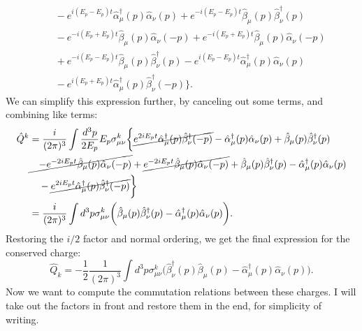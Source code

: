 \begin{align*}
    &\quad - e^{i(E_p-E_p)t} \hat{\alpha}_\mu^\dagger (p) \hat{\alpha}_\nu (p) + e^{-i(E_p-E_p)t} \hat{\beta}_\mu (p) \hat{\beta}_\nu^\dagger (p) \\
    &\quad - e^{-i(E_p+E_p)t} \hat{\beta}_\mu (p) \hat{\alpha}_\nu (-p)  + e^{-i(E_p+E_p)t} \hat{\beta}_\mu (p) \hat{\alpha}_\nu (-p) \\
    &\quad + e^{-i(E_p-E_p)t} \hat{\beta}_\mu (p) \hat{\beta}_\nu^\dagger (p) - e^{i(E_p-E_p)t} \hat{\alpha}_\mu^\dagger (p) \hat{\alpha}_\nu (p) \\
    &\quad - e^{i(E_p+E_p)t} \hat{\alpha}_\mu^\dagger (p) \hat{\beta}_\nu^\dagger (-p) \bigg\}.
\end{align*}
We can simplify this expression further, by canceling out some terms, and combining like terms:
\[
\begin{split}
    \hat{Q}^k &= \frac{i}{(2\pi)^3} \int \frac{d^3 p}{2E_p} E_p \sigma^k_{\mu\nu} \bigg\{ \cancel{e^{2iE_pt} \hat{\alpha}_\mu^\dagger (p) \hat{\beta}_\nu^\dagger (-p)}  - \hat{\alpha}_\mu^\dagger (p) \hat{\alpha}_\nu (p) + \hat{\beta}_\mu (p) \hat{\beta}_\nu^\dagger (p) \\
    &\cancel{\quad - e^{-2iE_pt} \hat{\beta}_\mu (p) \hat{\alpha}_\nu (-p)} +\cancel{ e^{-2iE_pt} \hat{\beta}_\mu (p) \hat{\alpha}_\nu (-p)}  + \hat{\beta}_\mu (p) \hat{\beta}_\nu^\dagger (p)  - \hat{\alpha}_\mu^\dagger (p) \hat{\alpha}_\nu (p) \\
    &\quad - \cancel{e^{2iE_pt} \hat{\alpha}_\mu^\dagger (p) \hat{\beta}_\nu^\dagger (-p)} \bigg\}\\
    &=\frac{i}{(2\pi)^3} \int d^3 p\sigma^k_{\mu\nu} \bigg( \hat{\beta}_\mu (p) \hat{\beta}_\nu^\dagger (p) - \hat{\alpha}_\mu^\dagger (p) \hat{\alpha}_\nu (p) \bigg).
\end{split}
\]
Restoring the $i/2$ factor and normal ordering, we get the final expression for the conserved charge:
\[
    \hat Q_k =-\frac{1}{2} \frac{1}{(2\pi)^3} \int d^3 p\sigma^k_{\mu\nu} \bigg( \hat{\beta}_\nu^\dagger (p) \hat{\beta}_\mu (p)  - \hat{\alpha}_\mu^\dagger (p) \hat{\alpha}_\nu (p) \bigg).
\]
Now we want to compute the commutation relations between these charges.
I will take out the factors in front and restore them in the end, for simplicity of writing. 
